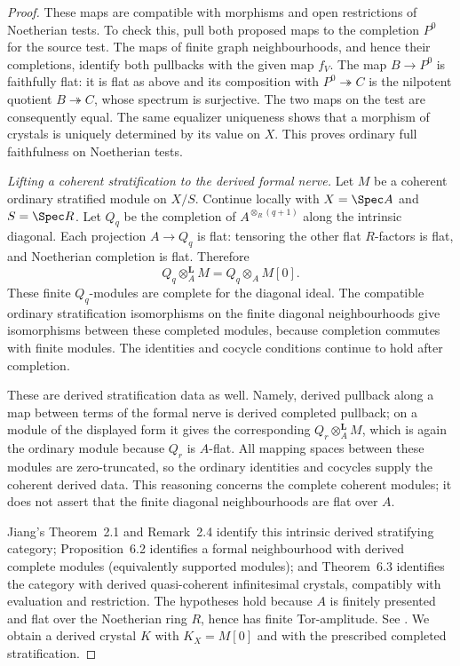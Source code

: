 \begin{proof}
These maps are compatible with morphisms and open restrictions of Noetherian tests.  To check this, pull both proposed maps to the completion $P^0$ for the source test.  The maps of finite graph neighbourhoods, and hence their completions, identify both pullbacks with the given map $f_V$.  The map $B\to P^0$ is faithfully flat: it is flat as above and its composition with $P^0\twoheadrightarrow C$ is the nilpotent quotient $B\twoheadrightarrow C$, whose spectrum is surjective.  The two maps on the test are consequently equal.  The same equalizer uniqueness shows that a morphism of crystals is uniquely determined by its value on $X$.  This proves ordinary full faithfulness on Noetherian tests.

\emph{Lifting a coherent stratification to the derived formal nerve.}
Let $M$ be a coherent ordinary stratified module on $X/S$.  Continue locally with $X=\Spec A$ and $S=\Spec R$.  Let $Q_q$ be the completion of $A^{\otimes_R(q+1)}$ along the intrinsic diagonal.  Each projection $A\to Q_q$ is flat: tensoring the other flat $R$-factors is flat, and Noetherian completion is flat.  Therefore
\[
                    Q_q\otimes_A^{\mathbf L}M=Q_q\otimes_AM[0].
\]
These finite $Q_q$-modules are complete for the diagonal ideal.  The compatible ordinary stratification isomorphisms on the finite diagonal neighbourhoods give isomorphisms between these completed modules, because completion commutes with finite modules.  The identities and cocycle conditions continue to hold after completion.

These are derived stratification data as well.  Namely, derived pullback along a map between terms of the formal nerve is derived completed pullback; on a module of the displayed form it gives the corresponding $Q_r\otimes_A^{\mathbf L}M$, which is again the ordinary module because $Q_r$ is $A$-flat.  All mapping spaces between these modules are zero-truncated, so the ordinary identities and cocycles supply the coherent derived data.  This reasoning concerns the complete coherent modules; it does not assert that the finite diagonal neighbourhoods are flat over $A$.

Jiang's Theorem~2.1 and Remark~2.4 identify this intrinsic derived stratifying category; Proposition~6.2 identifies a formal neighbourhood with derived complete modules (equivalently supported modules); and Theorem~6.3 identifies the category with derived quasi-coherent infinitesimal crystals, compatibly with evaluation and restriction.  The hypotheses hold because $A$ is finitely presented and flat over the Noetherian ring $R$, hence has finite Tor-amplitude.  See \citet[pp.~16--17, 32--34; also Theorem~B.5, pp.~43--45]{Jiang2023Derived}.  We obtain a derived crystal $K$ with $K_X=M[0]$ and with the prescribed completed stratification.


\end{proof}
